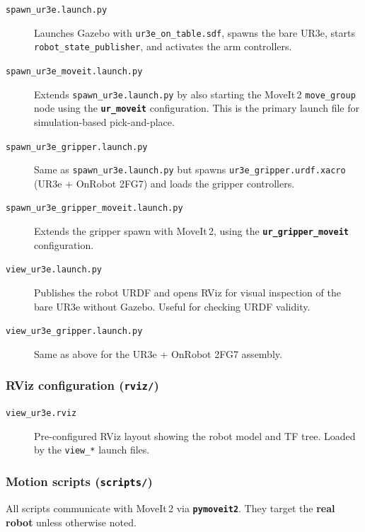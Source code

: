 \documentclass[11pt,a4paper]{article}
\newcommand{\pkg}[1]{\texttt{\textbf{#1}}}
\newcommand{\file}[1]{\texttt{#1}}
\begin{document}
\begin{description}
  \item[\file{spawn\_ur3e.launch.py}]
    Launches Gazebo with \file{ur3e\_on\_table.sdf}, spawns the bare UR3e,
    starts \texttt{robot\_state\_publisher}, and activates the arm controllers.

  \item[\file{spawn\_ur3e\_moveit.launch.py}]
    Extends \file{spawn\_ur3e.launch.py} by also starting the MoveIt\,2
    \texttt{move\_group} node using the \pkg{ur\_moveit} configuration.
    This is the primary launch file for simulation-based pick-and-place.

  \item[\file{spawn\_ur3e\_gripper.launch.py}]
    Same as \file{spawn\_ur3e.launch.py} but spawns \file{ur3e\_gripper.urdf.xacro}
    (UR3e + OnRobot 2FG7) and loads the gripper controllers.

  \item[\file{spawn\_ur3e\_gripper\_moveit.launch.py}]
    Extends the gripper spawn with MoveIt\,2, using the
    \pkg{ur\_gripper\_moveit} configuration.

  \item[\file{view\_ur3e.launch.py}]
    Publishes the robot URDF and opens RViz for visual inspection of the bare
    UR3e without Gazebo. Useful for checking URDF validity.

  \item[\file{view\_ur3e\_gripper.launch.py}]
    Same as above for the UR3e + OnRobot 2FG7 assembly.
\end{description}

\subsubsection{RViz configuration (\file{rviz/})}

\begin{description}
  \item[\file{view\_ur3e.rviz}]
    Pre-configured RViz layout showing the robot model and TF tree.
    Loaded by the \texttt{view\_*} launch files.
\end{description}

\subsubsection{Motion scripts (\file{scripts/})}

All scripts communicate with MoveIt\,2 via \pkg{pymoveit2}. They target the
\textbf{real robot} unless otherwise noted.
\end{document}
